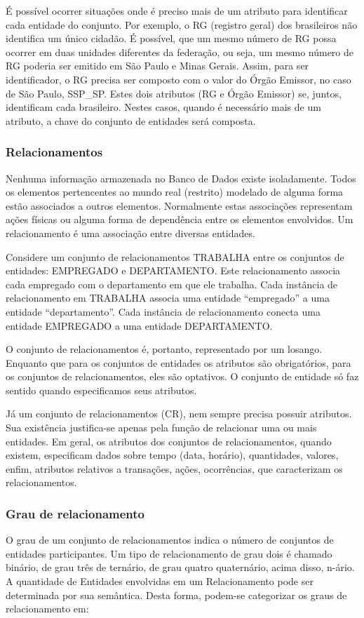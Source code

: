 \documentclass{article}
\begin{document}
É possível ocorrer situações onde é preciso mais de um atributo para identificar cada entidade do conjunto. Por exemplo, o RG (registro geral) dos brasileiros não identifica um único cidadão. É possível, que um mesmo número de RG possa ocorrer em duas unidades diferentes da federação, ou seja, um mesmo número de RG poderia ser emitido em São Paulo e Minas Gerais. Assim, para ser identificador, o RG precisa ser composto com o valor do Órgão Emissor, no caso de São Paulo, SSP\_SP. Estes dois atributos (RG e Órgão Emissor) se, juntos, identificam cada brasileiro. Nestes casos, quando é necessário mais de um atributo, a chave do conjunto de entidades será composta.



\subsubsection{Relacionamentos}
Nenhuma informação armazenada no Banco de Dados existe isoladamente. Todos os elementos pertencentes ao mundo real (restrito) modelado de alguma forma estão associados a outros elementos. Normalmente estas associações representam ações físicas ou alguma forma de dependência entre os elementos envolvidos. Um relacionamento é uma associação entre diversas entidades.

Considere um conjunto de relacionamentos TRABALHA entre os conjuntos de entidades: EMPREGADO e DEPARTAMENTO. Este relacionamento associa cada empregado com o departamento em que ele trabalha. Cada instância de relacionamento em TRABALHA associa uma entidade “empregado” a uma entidade “departamento”. Cada instância de relacionamento conecta uma entidade EMPREGADO a uma entidade DEPARTAMENTO.

O conjunto de relacionamentos é, portanto, representado por um losango. Enquanto que para os conjuntos de entidades os atributos são obrigatórios, para os conjuntos de relacionamentos, eles são optativos. O conjunto de entidade só faz sentido quando especificamos seus atributos.

Já um conjunto de relacionamentos (CR), nem sempre precisa possuir atributos. Sua existência justifica-se apenas pela função de relacionar uma ou mais entidades. Em geral, os atributos dos conjuntos de relacionamentos, quando existem, especificam dados sobre tempo (data, horário), quantidades, valores, enfim, atributos relativos a transações, ações, ocorrências, que caracterizam os relacionamentos.

\subsubsection*{Grau de relacionamento}
O grau de um conjunto de relacionamentos indica o número de conjuntos de entidades participantes. Um tipo de relacionamento de grau dois é chamado binário, de grau três de ternário, de grau quatro quaternário, acima disso, n-ário. A quantidade de Entidades envolvidas em um Relacionamento pode ser determinada por sua semântica. Desta forma, podem-se categorizar os graus de relacionamento em:
\end{document}
